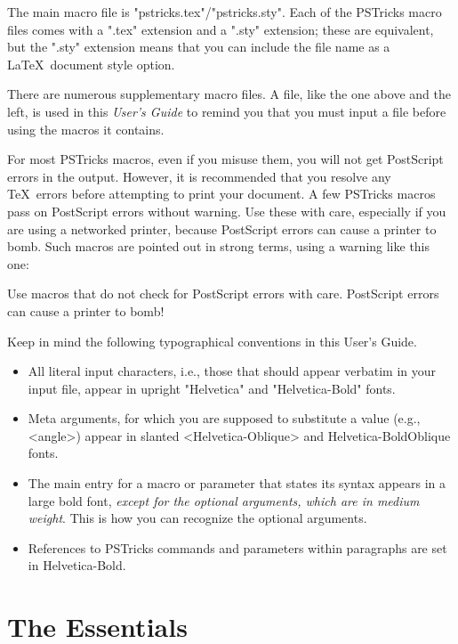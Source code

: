 The main macro file is "pstricks.tex"/"pstricks.sty". Each of the PSTricks
macro files comes with a ".tex" extension and a ".sty" extension; these are
equivalent, but the ".sty" extension means that you can include the file name
as a \LaTeX\ document style option.

There are numerous supplementary macro files. A file, like the one above and
the left, is used in this {\em User's Guide} to remind you that you must input
a file before using the macros it contains.

For most PSTricks macros, even if you misuse them, you will not get PostScript
errors in the output. However, it is recommended that you resolve any \TeX\
errors before attempting to print your document. A few PSTricks macros pass on
PostScript errors without warning. Use these with care, especially if you are
using a networked printer, because PostScript errors can cause a printer to
bomb. Such macros are pointed out in strong terms, using a warning like this
one:

\begin{Warning}
Use macros that do not check for PostScript errors with care. PostScript
errors can cause a printer to bomb!
\end{Warning}

Keep in mind the following typographical conventions in this User's Guide.
\begin{itemize}
\item All literal input characters, i.e., those that should appear verbatim in
your input file, appear in upright "Helvetica" and "Helvetica-Bold" fonts.
\item Meta arguments, for which you are supposed to substitute a value (e.g.,
<angle>) appear in slanted <Helvetica-Oblique> and {\UsageFont\MetaFont
Helvetica-BoldOblique} fonts.
\item The main entry for a macro or parameter that states its syntax appears
in a large bold font, {\em except for the optional arguments, which are in
medium weight}. This is how you can recognize the optional arguments.
\item References to PSTricks commands and parameters within paragraphs are set
in {\UsageFont Helvetica-Bold}.
\end{itemize}


\part{The Essentials\label{P-essentials}}


